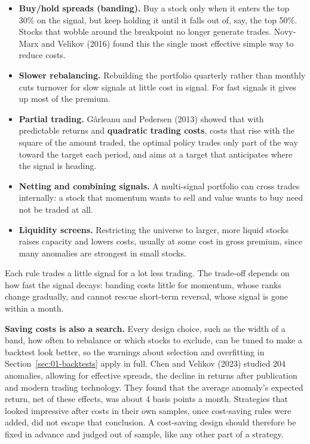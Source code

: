 \begin{itemize}
  \item \textbf{Buy/hold spreads (banding).} Buy a stock only when it enters the top 30\% on the signal, but keep holding it until it falls out of, say, the top 50\%. Stocks that wobble around the breakpoint no longer generate trades. Novy-Marx and Velikov (2016) found this the single most effective simple way to reduce costs.
  \item \textbf{Slower rebalancing.} Rebuilding the portfolio quarterly rather than monthly cuts turnover for slow signals at little cost in signal. For fast signals it gives up most of the premium.
  \item \textbf{Partial trading.} G\^arleanu and Pedersen (2013) showed that with predictable returns and \textbf{quadratic trading costs}, costs that rise with the square of the amount traded, the optimal policy trades only part of the way toward the target each period, and aims at a target that anticipates where the signal is heading.
  \item \textbf{Netting and combining signals.} A multi-signal portfolio can cross trades internally: a stock that momentum wants to sell and value wants to buy need not be traded at all.
  \item \textbf{Liquidity screens.} Restricting the universe to larger, more liquid stocks raises capacity and lowers costs, usually at some cost in gross premium, since many anomalies are strongest in small stocks.
\end{itemize}

Each rule trades a little signal for a lot less trading. The trade-off depends on how fast the signal decays: banding costs little for momentum, whose ranks change gradually, and cannot rescue short-term reversal, whose signal is gone within a month.

\textbf{Saving costs is also a search.} Every design choice, such as the width of a band, how often to rebalance or which stocks to exclude, can be tuned to make a backtest look better, so the warnings about selection and overfitting in Section~\ref{sec:01-backtests} apply in full. Chen and Velikov (2023) studied 204 anomalies, allowing for effective spreads, the decline in returns after publication and modern trading technology. They found that the average anomaly's expected return, net of these effects, was about 4 basis points a month. Strategies that looked impressive after costs in their own samples, once cost-saving rules were added, did not escape that conclusion. A cost-saving design should therefore be fixed in advance and judged out of sample, like any other part of a strategy.


